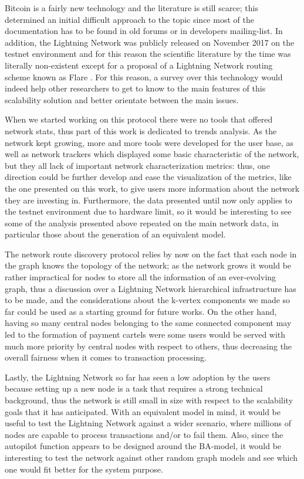	Bitcoin is a fairly new technology and the literature is still scarce; this determined an initial difficult approach to the topic since most of the documentation has to be found in old forums or in developers mailing-list. In addition, the Lightning Network was publicly released on November 2017 on the testnet environment and for this reason the scientific literature by the time was literally non-existent except for a proposal of a Lightning Network routing scheme known as Flare \cite{Prihodko2016}. For this reason, a survey over this technology would indeed help other researchers to get to know to the main features of this scalability solution and better orientate between the main issues.
	
	When we started working on this protocol there were no tools that offered network stats, thus part of this work is dedicated to trends analysis. As the network kept growing, more and more tools were developed for the user base, as well as network trackers which displayed some basic characteristic of the network, but they all lack of important network characterization metrics: thus, one direction could be further develop and ease the visualization of the metrics, like the one presented on this work, to give users more information about the network they are investing in. Furthermore, the data presented until now only applies to the testnet environment due to hardware limit, so it would be interesting to see some of the analysis presented above repeated on the main network data, in particular those about the generation of an equivalent model.
	
	The network route discovery protocol relies by now on the fact that each node in the graph knows the topology of the network; as the network grows it would be rather impractical for nodes to store all the information of an ever-evolving graph, thus a discussion over a Lightning Network hierarchical infrastructure has to be made, and the considerations about the k-vertex components we made so far could be used as a starting ground for future works. On the other hand, having so many central nodes belonging to the same connected component may led to the formation of payment cartels were some users would be served with much more priority by central nodes with respect to others, thus decreasing the overall fairness when it comes to transaction processing.
	
	Lastly, the Lightning Network so far has seen a low adoption by the users because setting up a new node is a task that requires a strong technical background, thus the network is still small in size with respect to the scalability goals that it has anticipated. With an equivalent model in mind, it would be useful to test the Lightning Network against a wider scenario, where millions of nodes are capable to process transactions and/or to fail them. Also, since the autopilot function appears to be designed around the BA-model, it would be interesting to test the network against other random graph models and see which one would fit better for the system purpose.
	
